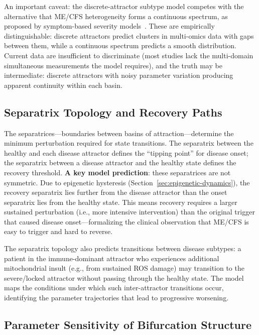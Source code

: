 An important caveat: the discrete-attractor subtype model competes with the alternative that ME/CFS heterogeneity forms a continuous spectrum, as proposed by symptom-based severity models~\cite{Nacul2020,Jason2010subtypes}. These are empirically distinguishable: discrete attractors predict clusters in multi-omics data with gaps between them, while a continuous spectrum predicts a smooth distribution. Current data are insufficient to discriminate (most studies lack the multi-domain simultaneous measurements the model requires), and the truth may be intermediate: discrete attractors with noisy parameter variation producing apparent continuity within each basin.

\subsection{Separatrix Topology and Recovery Paths}

The separatrices---boundaries between basins of attraction---determine the minimum perturbation required for state transitions. The separatrix between the healthy and each disease attractor defines the ``tipping point'' for disease onset; the separatrix between a disease attractor and the healthy state defines the recovery threshold. \textbf{A key model prediction}: these separatrices are not symmetric. Due to epigenetic hysteresis (Section~\ref{sec:epigenetic-dynamics}), the recovery separatrix lies further from the disease attractor than the onset separatrix lies from the healthy state. This means recovery requires a larger sustained perturbation (i.e., more intensive intervention) than the original trigger that caused disease onset---formalizing the clinical observation that ME/CFS is easy to trigger and hard to reverse.

The separatrix topology also predicts transitions between disease subtypes: a patient in the immune-dominant attractor who experiences additional mitochondrial insult (e.g., from sustained ROS damage) may transition to the severe/locked attractor without passing through the healthy state. The model maps the conditions under which such inter-attractor transitions occur, identifying the parameter trajectories that lead to progressive worsening.

\subsection{Parameter Sensitivity of Bifurcation Structure}

